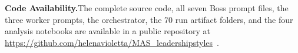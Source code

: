 \medskip
\noindent\textbf{Code Availability.}\enspace The complete source code, all seven Boss prompt files, the three worker prompts, the orchestrator, the 70 run artifact folders, and the four analysis notebooks are available in a public repository at \url{https://github.com/helenavioletta/MAS_leadershipstyles}~\cite{mas-leadershipstyles-repo}.